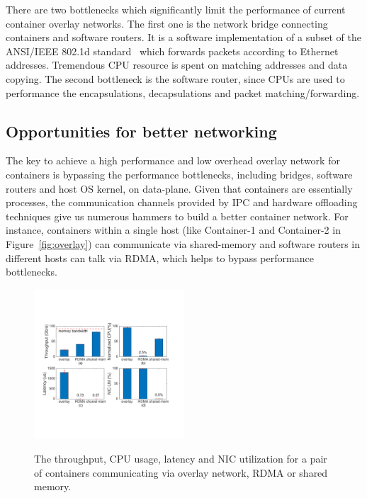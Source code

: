 There are two bottlenecks which significantly limit the performance
of current container overlay networks. The first one is the network bridge
connecting containers and software routers. It is a software implementation
of a subset of the ANSI/IEEE 802.1d standard~\cite{?} which forwards packets
according to Ethernet addresses. Tremendous CPU resource is spent on matching
addresses and data copying. The second bottleneck is the software router, since
CPUs are used to performance the encapsulations, decapsulations and packet matching/forwarding.


\subsection{Opportunities for better networking}

The key to achieve a high performance and low overhead overlay network
for containers is bypassing the performance bottlenecks, including
bridges, software routers and host OS kernel, on data-plane. Given that
containers are essentially processes, the communication channels provided
by IPC and hardware offloading techniques give us numerous hammers to 
build a better container network. For instance, 
containers within a single host (like Container-1 and 
Container-2 in Figure~\ref{fig:overlay}) can communicate via 
shared-memory and software routers in different hosts can talk via RDMA, 
which helps to bypass performance bottlenecks.

     \begin{figure}[ht]
     \centering 
     \includegraphics[width=0.5\textwidth]{figures/motivation/mot_rdma_shm.pdf}      
     \label{fig:mot_rdma_shm}
     \caption{The throughput, CPU usage, latency and NIC utilization for a pair of 
     containers communicating via overlay network, RDMA or shared memory.} 
     \end{figure}

